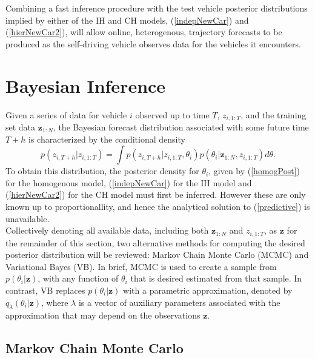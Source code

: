 \documentclass[12pt,a4paper]{article}\usepackage[]{graphicx}\usepackage[]{color}
\begin{document}
Combining a fast inference procedure with the test vehicle posterior distributions implied by either of the IH and CH models, (\ref{indepNewCar}) and (\ref{hierNewCar2}), will allow online, heterogenous, trajectory forecasts to be produced as the self-driving vehicle observes data for the vehicles it encounters.

\section{Bayesian Inference}
\label{sec:Inference}

Given a series of data for vehicle $i$ observed up to time $T$, $z_{i, 1:T}$, and the training set data $\textbf{z}_{1:N}$, the Bayesian forecast distribution associated with some future time $T+h$ is characterized by the conditional density
\begin{equation}
\label{predictive}
p(z_{i, T+h} | z_{i, 1:T}) =\int p(z_{i, T+h}|z_{i, 1:T}, \theta_i) p(\theta_i | \textbf{z}_{1:N}, z_{i, 1:T}) d\theta.
\end{equation}
To obtain this distribution, the posterior density for $\theta_i$, given by (\ref{homogPost}) for the homogenous model, (\ref{indepNewCar}) for the IH model and (\ref{hierNewCar2}) for the CH model must first be inferred. However these are only known up to proportionallity, and hence the analytical solution to (\ref{predictive}) is unavailable.
\\

Collectively denoting all available data, including both $\textbf{z}_{1:N}$ and $z_{i, 1:T}$, as $\textbf{z}$ for the remainder of this section, two alternative methods for computing the desired posterior distribution will be reviewed: Markov Chain Monte Carlo (MCMC) and Variational Bayes (VB). In brief, MCMC is used to create a sample from $p(\theta_i | \textbf{z})$, with any function of $\theta_i$ that is desired estimated from that sample. In contrast, VB replaces $p(\theta_i | \textbf{z})$ with a parametric approximation, denoted by $q_{\lambda}(\theta_i |\textbf{z})$, where $\lambda$ is a vector of auxiliary parameters associated with the approximation that may depend on the observations $\textbf{z}$.

\subsection{Markov Chain Monte Carlo}
\label{subsec:MCMC}
\end{document}
